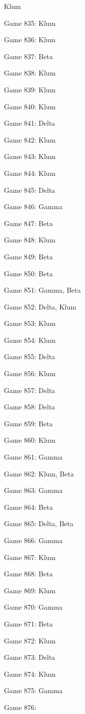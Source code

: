 \documentclass{article}
\begin{document}
\begin{multicols}{3}
\begin{compactitem}
Klum
\item Game 835:
Klum
\item Game 836:
Klum
\item Game 837:
Beta
\item Game 838:
Klum
\item Game 839:
Klum
\item Game 840:
Klum
\item Game 841:
Delta
\item Game 842:
Klum
\item Game 843:
Klum
\item Game 844:
Klum
\item Game 845:
Delta
\item Game 846:
Gamma
\item Game 847:
Beta
\item Game 848:
Klum
\item Game 849:
Beta
\item Game 850:
Beta
\item Game 851:
Gamma, Beta
\item Game 852:
Delta, Klum
\item Game 853:
Klum
\item Game 854:
Klum
\item Game 855:
Delta
\item Game 856:
Klum
\item Game 857:
Delta
\item Game 858:
Delta
\item Game 859:
Beta
\item Game 860:
Klum
\item Game 861:
Gamma
\item Game 862:
Klum, Beta
\item Game 863:
Gamma
\item Game 864:
Beta
\item Game 865:
Delta, Beta
\item Game 866:
Gamma
\item Game 867:
Klum
\item Game 868:
Beta
\item Game 869:
Klum
\item Game 870:
Gamma
\item Game 871:
Beta
\item Game 872:
Klum
\item Game 873:
Delta
\item Game 874:
Klum
\item Game 875:
Gamma
\item Game 876:

\end{compactitem}
\end{multicols}
\end{document}
